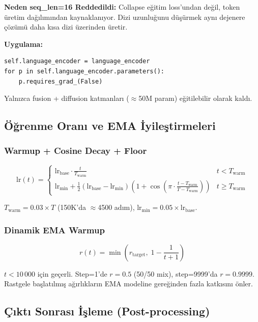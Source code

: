 \documentclass[12pt,a4paper]{article}
\begin{document}
\textbf{Neden seq\_len=16 Reddedildi:} Collapse eğitim loss'undan değil, token üretim dağılımından kaynaklanıyor. Dizi uzunluğunu düşürmek aynı dejenere çözümü daha kısa dizi üzerinden üretir.

\textbf{Uygulama:}
\begin{verbatim}
self.language_encoder = language_encoder
for p in self.language_encoder.parameters():
    p.requires_grad_(False)
\end{verbatim}

Yalnızca fusion + diffusion katmanları ($\approx$50M param) eğitilebilir olarak kaldı.

\subsection{Öğrenme Oranı ve EMA İyileştirmeleri}

\subsubsection{Warmup + Cosine Decay + Floor}

\begin{equation}
\text{lr}(t) = \begin{cases}
\text{lr}_{\text{base}} \cdot \frac{t}{T_{\text{warm}}} & t < T_{\text{warm}} \\[4pt]
\text{lr}_{\min} + \frac{1}{2}(\text{lr}_{\text{base}} - \text{lr}_{\min})\left(1 + \cos\!\left(\pi \cdot \frac{t - T_{\text{warm}}}{T - T_{\text{warm}}}\right)\right) & t \geq T_{\text{warm}}
\end{cases}
\end{equation}

$T_{\text{warm}} = 0.03 \times T$ (150K'da $\approx$4500 adım), $\text{lr}_{\min} = 0.05 \times \text{lr}_{\text{base}}$.

\subsubsection{Dinamik EMA Warmup}

\begin{equation}
r(t) = \min\!\left(r_{\text{target}},\; 1 - \frac{1}{t+1}\right)
\end{equation}

$t < 10\,000$ için geçerli. Step=1'de $r=0.5$ (50/50 mix), step=9999'da $r=0.9999$. Rastgele başlatılmış ağırlıkların EMA modeline gereğinden fazla katkısını önler.

\subsection{Çıktı Sonrası İşleme (Post-processing)}
\end{document}
